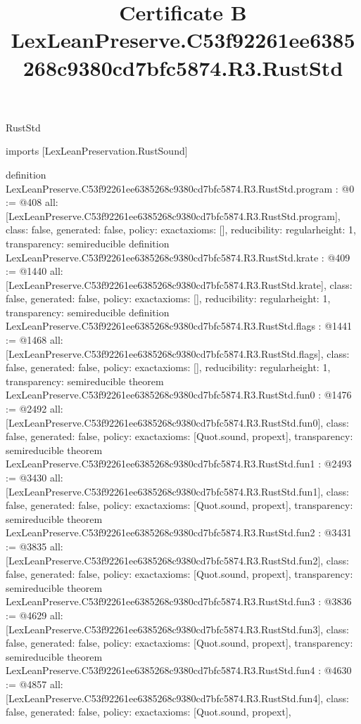 \begin{lexlean}{RustStd}
\title{Certificate B LexLeanPreserve.C53f92261ee6385268c9380cd7bfc5874.R3.RustStd}
\begin{coremodule}
imports [LexLeanPreservation.RustSound]

definition LexLeanPreserve.C53f92261ee6385268c9380cd7bfc5874.R3.RustStd.program : @0 := @408 {
  all: [LexLeanPreserve.C53f92261ee6385268c9380cd7bfc5874.R3.RustStd.program],
  class: false,
  generated: false,
  policy: exact{axioms: []},
  reducibility: regular{height: 1},
  transparency: semireducible
}
definition LexLeanPreserve.C53f92261ee6385268c9380cd7bfc5874.R3.RustStd.krate : @409 := @1440 {
  all: [LexLeanPreserve.C53f92261ee6385268c9380cd7bfc5874.R3.RustStd.krate],
  class: false,
  generated: false,
  policy: exact{axioms: []},
  reducibility: regular{height: 1},
  transparency: semireducible
}
definition LexLeanPreserve.C53f92261ee6385268c9380cd7bfc5874.R3.RustStd.flags : @1441 := @1468 {
  all: [LexLeanPreserve.C53f92261ee6385268c9380cd7bfc5874.R3.RustStd.flags],
  class: false,
  generated: false,
  policy: exact{axioms: []},
  reducibility: regular{height: 1},
  transparency: semireducible
}
theorem LexLeanPreserve.C53f92261ee6385268c9380cd7bfc5874.R3.RustStd.fun0 : @1476 := @2492 {
  all: [LexLeanPreserve.C53f92261ee6385268c9380cd7bfc5874.R3.RustStd.fun0],
  class: false,
  generated: false,
  policy: exact{axioms: [Quot.sound, propext]},
  transparency: semireducible
}
theorem LexLeanPreserve.C53f92261ee6385268c9380cd7bfc5874.R3.RustStd.fun1 : @2493 := @3430 {
  all: [LexLeanPreserve.C53f92261ee6385268c9380cd7bfc5874.R3.RustStd.fun1],
  class: false,
  generated: false,
  policy: exact{axioms: [Quot.sound, propext]},
  transparency: semireducible
}
theorem LexLeanPreserve.C53f92261ee6385268c9380cd7bfc5874.R3.RustStd.fun2 : @3431 := @3835 {
  all: [LexLeanPreserve.C53f92261ee6385268c9380cd7bfc5874.R3.RustStd.fun2],
  class: false,
  generated: false,
  policy: exact{axioms: [Quot.sound, propext]},
  transparency: semireducible
}
theorem LexLeanPreserve.C53f92261ee6385268c9380cd7bfc5874.R3.RustStd.fun3 : @3836 := @4629 {
  all: [LexLeanPreserve.C53f92261ee6385268c9380cd7bfc5874.R3.RustStd.fun3],
  class: false,
  generated: false,
  policy: exact{axioms: [Quot.sound, propext]},
  transparency: semireducible
}
theorem LexLeanPreserve.C53f92261ee6385268c9380cd7bfc5874.R3.RustStd.fun4 : @4630 := @4857 {
  all: [LexLeanPreserve.C53f92261ee6385268c9380cd7bfc5874.R3.RustStd.fun4],
  class: false,
  generated: false,
  policy: exact{axioms: [Quot.sound, propext]},
}
\end{coremodule}
\end{lexlean}
